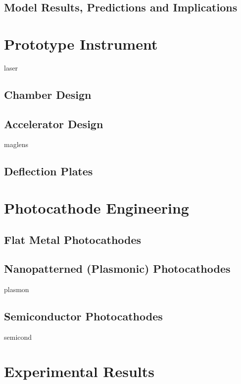 \documentclass{uicthesi}
\begin{document}
\section{Model Results, Predictions and Implications} \label{sec:model_results}

\chapter{Prototype Instrument}

  {laser}

\section{Chamber Design}

\section{Accelerator Design}

  {maglens}

\section{Deflection Plates}

\chapter{Photocathode Engineering}

\section{Flat Metal Photocathodes}

\section{Nanopatterned (Plasmonic) Photocathodes}

  {plasmon}

\section{Semiconductor Photocathodes}

  {semicond}

\chapter{Experimental Results}

 


\end{document}
